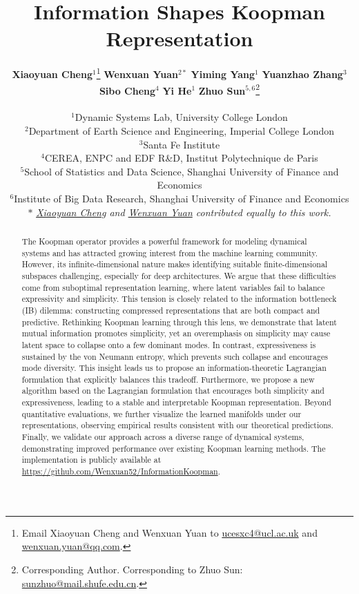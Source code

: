 \documentclass{article} %
\title{Information Shapes Koopman Representation}
\author{\textbf{Xiaoyuan Cheng}$^{1}$\thanks{Email Xiaoyuan Cheng and Wenxuan Yuan to \url{ucesxc4@ucl.ac.uk} and \url{wenxuan.yuan@qq.com}.} \quad
\textbf{Wenxuan Yuan}$^{2 *}$ \quad
\textbf{Yiming Yang}$^{1}$ \quad
\textbf{Yuanzhao Zhang}$^{3}$ \\
\textbf{Sibo Cheng}$^{4}$ \quad
\textbf{Yi He}$^{1}$ \quad
\textbf{Zhuo Sun}$^{5,6}$\thanks{Corresponding Author. Corresponding to Zhuo Sun: \url{sunzhuo@mail.shufe.edu.cn}.} \\
\\
$^{1}$Dynamic Systems Lab, University College London \\ 
$^{2}$Department of Earth Science and Engineering, Imperial College London \\ 
$^{3}$Santa Fe Institute \\ 
$^{4}$CEREA, ENPC and EDF R\&D, Institut Polytechnique de Paris \\
$^{5}$School of Statistics and Data Science, Shanghai University of Finance and Economics\\ 
$^{6}$Institute of Big Data Research, Shanghai University of Finance and Economics\\
$*$ \textit{\underline{Xiaoyuan Cheng} and \underline{Wenxuan Yuan} contributed equally to this work.}
}
\begin{document}
\maketitle

\begin{abstract}
The Koopman operator provides a powerful framework for modeling dynamical systems and has attracted growing interest from the machine learning community.
However, its infinite-dimensional nature makes identifying suitable finite-dimensional subspaces challenging, especially for deep architectures.
We argue that these difficulties come from suboptimal representation learning, where latent variables fail to balance expressivity and simplicity.
This tension is closely related to the information bottleneck (IB) dilemma: constructing compressed representations that are both compact and predictive. Rethinking Koopman learning through this lens, we demonstrate that latent mutual information promotes simplicity, yet an overemphasis on simplicity may cause latent space to collapse onto a few dominant modes. In contrast, expressiveness is sustained by the von Neumann entropy, which prevents such collapse and encourages mode diversity. This insight leads us to propose an information-theoretic Lagrangian formulation that explicitly balances this tradeoff. Furthermore, we propose a new algorithm based on the Lagrangian formulation that encourages both simplicity and expressiveness, leading to a stable and interpretable Koopman representation. Beyond quantitative evaluations, we further visualize the learned manifolds under our representations, observing empirical results consistent with our theoretical predictions. Finally, we validate our approach across a diverse range of dynamical systems, demonstrating improved performance over existing Koopman learning methods. The implementation is publicly available at \url{https://github.com/Wenxuan52/InformationKoopman}.
\end{abstract}
\end{document}
